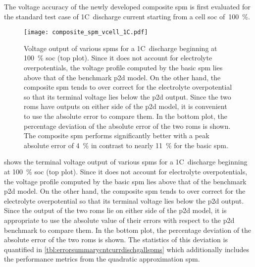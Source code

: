 The  voltage  accuracy of  the  newly  developed  composite \gls{spm}  is  first
evaluated for  the standard test  case of 1C~discharge current starting  from a
cell \gls{soc} of~\SI{100}{\percent}.

\begin{figure}[!htbp]
    \centering
    \texttt{[image: composite\_spm\_vcell\_1C.pdf]}
    \caption[%
    Comparison  of  terminal  voltages  of  composite  ,  basic
     and the  model for a 1C~discharge
    ]%
    {%
        Voltage output  of various \glspl{spm}  for a 1C~discharge  beginning at
        \SI{100}{\percent} \gls{soc} (top  plot). Since it does  not account for
        electrolyte overpotentials,  the voltage  profile computed by  the basic
        \gls{spm} lies above that of the benchmark \gls{p2d} model. On the other
        hand, the composite \gls{spm} tends  to over correct for the electrolyte
        overpotential  so that  its terminal  voltage lies  below the  \gls{p2d}
        output. Since  the two \glspl{rom}  have outputs  on either side  of the
        \gls{p2d}  model,  it  is  convenient  to  use  the  absolute  error  to
        compare  them. In  the  bottom  plot, the  percentage  deviation of  the
        absolute error of the two  \glspl{rom} is shown. The composite \gls{spm}
        performs  significantly better  with a  peak absolute  error of  \approx
        \SI{4}{\percent} in  contrast to nearly \SI{11}{\percent}  for the basic
        \gls{spm}.
    }%
    \label{fig:voltageoutputcompareallSPMs1C}
\end{figure}

  shows the  terminal voltage  output of
various \glspl{spm} for a 1C~discharge beginning at \SI{100}{\percent} \gls{soc}
(top  plot). Since  it  does  not account  for  electrolyte overpotentials,  the
voltage profile computed by the basic \gls{spm} lies above that of the benchmark
\gls{p2d}  model. On  the  other hand,  the composite  \gls{spm}  tends to  over
correct  for the  electrolyte overpotential  so that  its terminal  voltage lies
below  the \gls{p2d}  output. Since  the output  of the  two \glspl{rom}  lie on
either side of the \gls{p2d} model, it  is appropriate to use the absolute value
of their errors with respect to the  \gls{p2d} benchmark to compare them. In the
bottom  plot,  the  percentage  deviation  of the  absolute  error  of  the  two
\glspl{rom} is shown. The statistics of this deviation is quantified
in \cref{tbl:errorsummarycntcurrdischgallspms} which additionally includes the
performance metrics from the quadratic approximation \gls{spm}.

